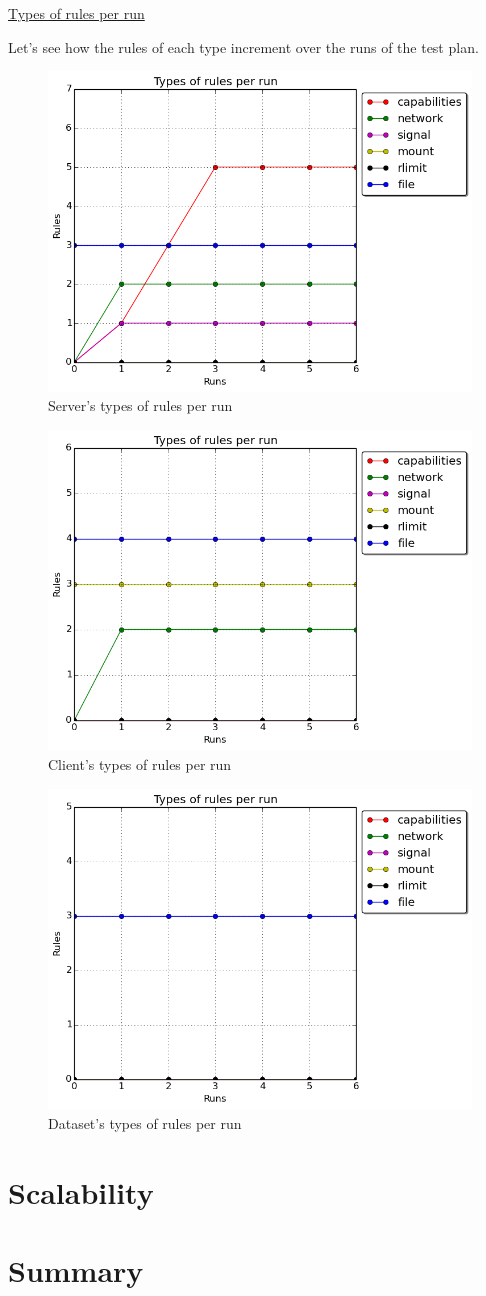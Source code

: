 \underline{Types of rules per run}
\hfill\break

Let's see how the rules of each type increment over the runs of the test plan.

\begin{figure}[h!]
  \centering
   \includegraphics[width=0.64\linewidth]{./figures/mediastreaming/types_cloudsuitemedia-streamingserver.png}
   \caption{Server's types of rules per run}
\end{figure}

\begin{figure}[h!]
  \centering
   \includegraphics[width=0.64\linewidth]{./figures/mediastreaming/types_cloudsuitemedia-streamingclient.png}
   \caption{Client's types of rules per run}
\end{figure}

\begin{figure}[h!]
  \centering
   \includegraphics[width=0.64\linewidth]{./figures/mediastreaming/types_cloudsuitemedia-streamingdataset.png}
   \caption{Dataset's types of rules per run}
\end{figure}

\section{Scalability}
\section{Summary}
